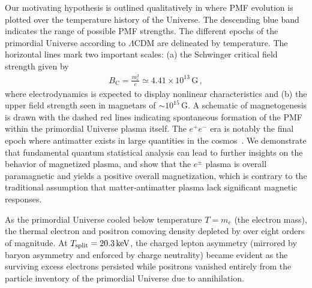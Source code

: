 Our motivating hypothesis is outlined qualitatively in  where PMF evolution is plotted over the temperature history of the Universe. The descending blue band indicates the range of possible PMF strengths. The different epochs of the primordial Universe according to $\Lambda\mathrm{CDM}$ are delineated by temperature. The horizontal lines mark two important scales: (a) the Schwinger critical field strength given by
\begin{align}
 \label{crit:1}
 B_\mathrm{C} = \frac{m_{e}^{2}}{e}\simeq4.41\times10^{13}\,\mathrm{G}\,,
\end{align}
where electrodynamics is expected to display nonlinear characteristics and (b) the upper field strength seen in magnetars of $\sim10^{15}\,\mathrm{G}$. A schematic of magnetogenesis is drawn with the dashed red lines indicating spontaneous formation of the PMF within the primordial Universe plasma itself. The $e^{+}e^{-}$ era is notably the final epoch where antimatter exists in large quantities in the cosmos~\cite{Rafelski:2023emw}. We demonstrate that fundamental quantum statistical analysis can lead to further insights on the behavior of magnetized plasma, and show that the $e^\pm$ plasma is overall paramagnetic and yields a positive overall magnetization, which is contrary to the traditional assumption that matter-antimatter plasma lack significant magnetic responses.

As the primordial Universe cooled below temperature $T\!=\!m_{e}$ (the electron mass), the thermal electron and positron comoving density depleted by over eight orders of magnitude. At $T_\mathrm{split}=20.3\text{\,keV}$, the charged lepton asymmetry (mirrored by baryon asymmetry and enforced by charge neutrality) became evident as the surviving excess electrons persisted while positrons vanished entirely from the particle inventory of the primordial Universe due to annihilation.

